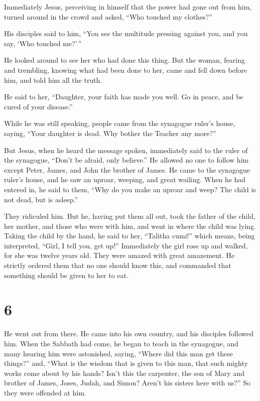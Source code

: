  Immediately Jesus, perceiving in himself that the power
had gone out from him, turned around in the crowd and asked, ``Who
touched my clothes?''

 His disciples said to him, ``You see the multitude
pressing against you, and you say, `Who touched me?'\,''

 He looked around to see her who had done this thing.
 But the woman, fearing and trembling, knowing what had
been done to her, came and fell down before him, and told him all the
truth.

 He said to her, ``Daughter, your faith has made you well.
Go in peace, and be cured of your disease.''

 While he was still speaking, people came from the
synagogue ruler's house, saying, ``Your daughter is dead. Why bother the
Teacher any more?''

 But Jesus, when he heard the message spoken, immediately
said to the ruler of the synagogue, ``Don't be afraid, only believe.''
 He allowed no one to follow him except Peter, James, and
John the brother of James.  He came to the synagogue
ruler's house, and he saw an uproar, weeping, and great wailing.
 When he had entered in, he said to them, ``Why do you make
an uproar and weep? The child is not dead, but is asleep.''

 They ridiculed him. But he, having put them all out, took
the father of the child, her mother, and those who were with him, and
went in where the child was lying.  Taking the child by the
hand, he said to her, ``Talitha cumi!'' which means, being interpreted,
``Girl, I tell you, get up!''  Immediately the girl rose up
and walked, for she was twelve years old. They were amazed with great
amazement.  He strictly ordered them that no one should
know this, and commanded that something should be given to her to eat.

\hypertarget{section-5}{%
\section{6}\label{section-5}}

 He went out from there. He came into his own country, and
his disciples followed him.  When the Sabbath had come, he
began to teach in the synagogue, and many hearing him were astonished,
saying, ``Where did this man get these things?'' and, ``What is the
wisdom that is given to this man, that such mighty works come about by
his hands?  Isn't this the carpenter, the son of Mary and
brother of James, Joses, Judah, and Simon? Aren't his sisters here with
us?'' So they were offended at him.

